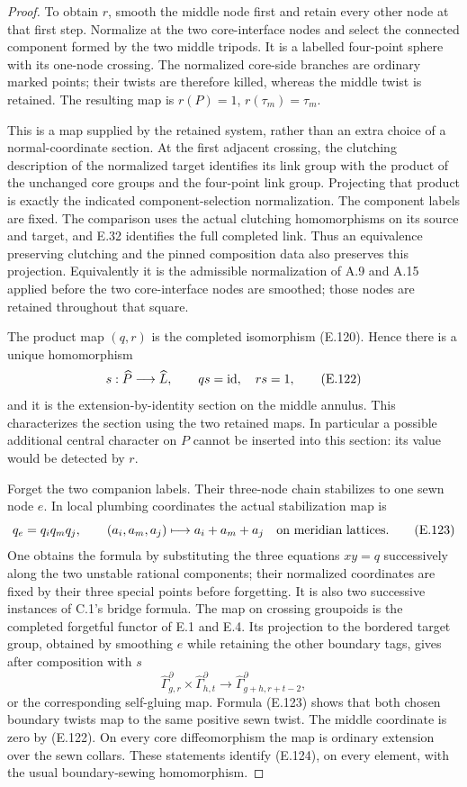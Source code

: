 \begin{proof}
To obtain $r$, smooth the middle node first and
retain every other node at that first step.
Normalize at the two core-interface nodes and
select the connected component formed by the
two middle tripods.  It is a labelled four-point
sphere with its one-node crossing.  The normalized
core-side branches are ordinary marked points;
their twists are therefore killed, whereas the
middle twist is retained.  The resulting map is
$r(P)=1$, $r(\tau_m)=\tau_m$.

This is a map supplied by the retained system,
rather than an extra choice of a normal-coordinate
section.  At the first adjacent crossing, the
clutching description of the normalized target
identifies its link group with the product of
the unchanged core groups and the four-point
link group.  Projecting that product is exactly
the indicated component-selection normalization.
The component labels are fixed.  The comparison
uses the actual clutching homomorphisms on its
source and target, and E.32 identifies the full
completed link.  Thus an equivalence preserving
clutching and the pinned composition data also
preserves this projection.  Equivalently it is
the admissible normalization of A.9 and A.15
applied before the two core-interface nodes are
smoothed; those nodes are retained throughout
that square.

The product map $(q,r)$ is the completed isomorphism
(E.120).  Hence there is a unique homomorphism
\[
 s:\widehat P\longrightarrow\widehat L,
              \qquad qs=\mathrm{id},\quad rs=1,                       \tag{E.122}
\]
and it is the extension-by-identity section on the
middle annulus.  This characterizes the section
using the two retained maps.  In particular a
possible additional central character on $P$
cannot be inserted into this section: its value
would be detected by $r$.

Forget the two companion labels.  Their three-node
chain stabilizes to one sewn node $e$.  In local
plumbing coordinates the actual stabilization map
is
\[
       q_e=q_iq_mq_j,
       \qquad (a_i,a_m,a_j)\longmapsto a_i+a_m+a_j
              \quad\hbox{on meridian lattices}.               \tag{E.123}
\]
One obtains the formula by substituting the three
equations $xy=q$ successively along the two
unstable rational components; their normalized
coordinates are fixed by their three special
points before forgetting.  It is also two
successive instances of C.1's bridge formula.
The map on crossing groupoids is the completed
forgetful functor of E.1 and E.4.  Its projection
to the bordered target group, obtained by
smoothing $e$ while retaining the other boundary
tags, gives after composition with $s$
\[
 \widehat\Gamma_{g,r}^{\partial}\times
 \widehat\Gamma_{h,t}^{\partial}
       \longrightarrow\widehat\Gamma_{g+h,r+t-2}^{\partial},
                                                               \tag{E.124}
\]
or the corresponding self-gluing map.  Formula
(E.123) shows that both chosen boundary twists
map to the same positive sewn twist.  The
middle coordinate is zero by (E.122).
On every core diffeomorphism the map is ordinary
extension over the sewn collars.  These statements
identify (E.124), on every element, with the
usual boundary-sewing homomorphism.


\end{proof}
